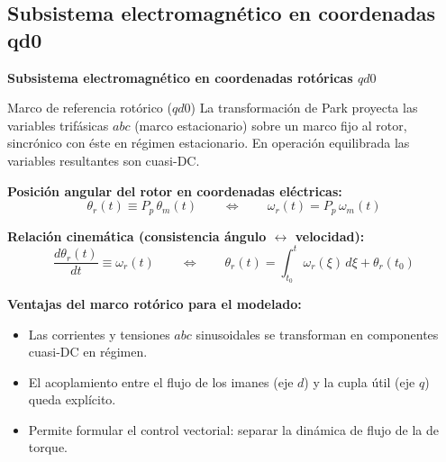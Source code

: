 \documentclass[aspectratio=169,t]{beamer}
\newcommand{\sectionslide}[1]{%
  \begin{frame}[plain]
    \vfill
    \centering
    {\Huge\bfseries\color{uncBlue} #1\par}
    \vfill
  \end{frame}
}
\begin{document}
\subsection{Subsistema electromagnético en coordenadas qd0}
\sectionslide{Subsistema electromagnético en coordenadas rotóricas $qd0$}

\begin{frame}{Marco de referencia rotórico ($qd0$)}
{\small\color{uncGray}La transformación de Park proyecta las variables trifásicas $abc$ (marco estacionario) sobre un marco fijo al rotor, sincrónico con éste en régimen estacionario. En operación equilibrada las variables resultantes son cuasi-DC.}\par
\vspace{3mm}

\textbf{Posición angular del rotor en coordenadas eléctricas:}
\begin{equation*}
\theta_r(t) \equiv P_p\,\theta_m(t)
\qquad\Longleftrightarrow\qquad
\omega_r(t) = P_p\,\omega_m(t)
\end{equation*}

\textbf{Relación cinemática (consistencia ángulo $\leftrightarrow$ velocidad):}
\begin{equation*}
\frac{d\theta_r(t)}{dt} \equiv \omega_r(t)
\qquad\Longleftrightarrow\qquad
\theta_r(t) = \int_{t_0}^{t} \omega_r(\xi)\,d\xi + \theta_r(t_0)
\end{equation*}

\vspace{2mm}
\textbf{Ventajas del marco rotórico para el modelado:}
\begin{itemize}\small
\item Las corrientes y tensiones $abc$ sinusoidales se transforman en componentes cuasi-DC en régimen.
\item El acoplamiento entre el flujo de los imanes (eje $d$) y la cupla útil (eje $q$) queda explícito.
\item Permite formular el control vectorial: separar la dinámica de flujo de la de torque.
\end{itemize}
\end{frame}
\end{document}
